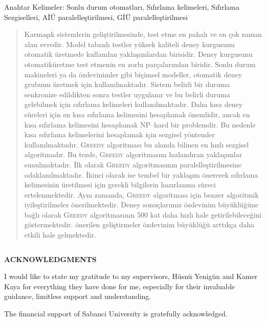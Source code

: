 \documentclass[12pt, a4paper]{report}
\begin{document}
\begin{center}
Anahtar Kelimeler: Sonlu durum otomatları, Sıfırlama kelimeleri, Sıfırlama Sezgiselleri, AİÜ paralelleştirilmesi, GİÜ paralelleştirilmesi
\end{center}

\begin{quote}
\begin{spacing}{1}
Karmaşık sistemlerin geliştirilmesinde, test etme en pahalı  ve en çok zaman alan evredir. Model tabanlı testler yüksek kaliteli deney kurgusunu otomatik üretmede kullanılan yaklaşımlardan birisidir. Deney kurgusunu otomatik\linebreak üretme test etmenin en zorlu parçalarından biridir. Sonlu durum makineleri ya da özdevinimler gibi biçimsel modeller, otomatik deney grubunu üretmek için kullanılmaktadır. Sistem  belirli bir duruma senkronize edildikten sonra testler uygulanır ve bu belirli duruma gelebilmek için sıfırlama kelimeleri kullanılmaktadır. Daha kısa deney süreleri için en kısa sıfırlama kelimesini hesaplamak önemlidir, ancak en kısa sıfırlama kelimesini hesaplamak NP--hard bir problemdir. Bu nedenle kısa sıfırlama kelimelerini hesaplamak için sezgisel yöntemler kullanılmaktadır. \textsc{Greedy} algoritması bu alanda bilinen en hızlı sezgisel algoritmadır. Bu tezde, \textsc{Greedy} algoritmasını hızlandıran yaklaşımlar sunulmaktadır. İlk olarak \textsc{Greedy} algoritmasının paralelleştirilmesine odaklanılmaktadır. İkinci olarak ise tembel bir yaklaşım önererek sıfırlama kelimesinin üretilmesi için gerekli bilgilerin hazırlanma süreci ertelenmektedir. Aynı zamanda, \textsc{Greedy} algoritması için benzer algoritmik iyileştirilmeler önerilmektedir. Deney sonuçlarımız özdevinim büyüklüğüne bağlı olarak \textsc{Greedy} algoritmasının 500 kat daha hızlı hale getirilebileceğini göstermektedir. önerilen geliştirmeler özdevinim büyüklüğü arttıkça daha etkili hale gelmektedir.
\end{spacing}
\end{quote}
\clearpage
$ $
\vspace{2cm}
\begin{center}
\textbf{ACKNOWLEDGMENTS}
\end{center}

I would like to state my gratitude to my supervisors, Hüsnü Yenigün and Kamer Kaya for everything they have done for me, especially for their invaluable guidance, limitless support and understanding.

The financial support of Sabanci University is gratefully acknowledged.
\end{document}
